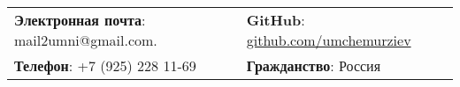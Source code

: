 \documentclass[letterpaper, 11pt]{article}
\begin{document}


\vspace{0.5cm} 
\begin{center}
\begin{tabular}{ll}
\textbf{Электронная почта}: mail2umni@gmail.com. &
\hspace{0.55in} \textbf{GitHub}: \href{https://github.com/umchemurziev}{github.com/umchemurziev} \\

\textbf{Телефон}: +7 (925) 228 11-69   &  
\hspace{0.55in} \textbf{Гражданство}: Россия \\
\end{tabular}
\end{center}


\setlength{\tabcolsep}{8pt}
\end{document}
